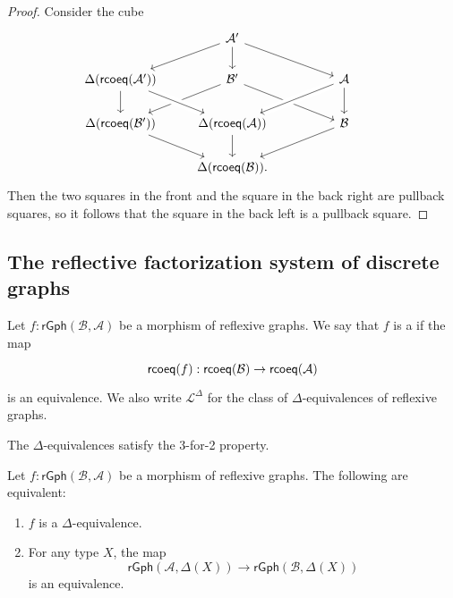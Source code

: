 \begin{proof}
Consider the cube
\begin{equation*}
\begin{tikzcd}
& \mathcal{A}' \arrow[dr] \arrow[d] \arrow[dl] \\
\Delta(\rcoeq(\mathcal{A}')) \arrow[d] & \mathcal{B}' \arrow[dl] \arrow[dr] & \mathcal{A} \arrow[dl,crossing over] \arrow[d] \\
\Delta(\rcoeq(\mathcal{B}')) \arrow[dr] & \Delta(\rcoeq(\mathcal{A})) \arrow[d] \arrow[from=ul,crossing over] & \mathcal{B} \arrow[dl] \\
& \Delta(\rcoeq(\mathcal{B})). & \phantom{\Delta(\rcoeq(\mathcal{A}'))}
\end{tikzcd}
\end{equation*}
Then the two squares in the front and the square in the back right are pullback squares, so it follows that the square in the back left is a pullback square.
\end{proof}

\subsection{The reflective factorization system of discrete graphs}

\begin{defn}
Let $f:\mathsf{rGph}(\mathcal{B},\mathcal{A})$ be a morphism of reflexive graphs. We say that $f$ is a  if the map
\begin{equation*}
\begin{tikzcd}
\rcoeq(f):\rcoeq(\mathcal{B})\to \rcoeq(\mathcal{A})
\end{tikzcd}
\end{equation*}
is an equivalence. We also write $\mathcal{L}^\Delta$ for the class of $\Delta$-equivalences of reflexive graphs.
\end{defn}

\begin{lem}
The $\Delta$-equivalences satisfy the 3-for-2 property.
\end{lem}

\begin{prp}
Let $f:\mathsf{rGph}(\mathcal{B},\mathcal{A})$ be a morphism of reflexive graphs. The following are equivalent:
\begin{enumerate}
\item $f$ is a $\Delta$-equivalence.
\item For any type $X$, the map
\begin{equation*}
\mathsf{rGph}(\mathcal{A},\Delta(X))\to\mathsf{rGph}(\mathcal{B},\Delta(X))
\end{equation*}
is an equivalence.
\end{enumerate}
\end{prp}

